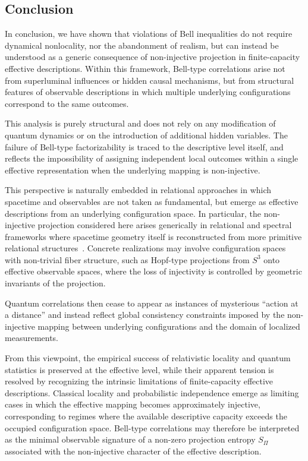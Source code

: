 \subsection{Conclusion}
  \label{subsec:conclusion}

  In conclusion, we have shown that violations of Bell inequalities do not require
  dynamical nonlocality, nor the abandonment of realism, but can instead be understood
  as a generic consequence of non-injective projection in finite-capacity effective
  descriptions.
  Within this framework, Bell-type correlations arise not from superluminal influences
  or hidden causal mechanisms, but from structural features of observable descriptions
  in which multiple underlying configurations correspond to the same outcomes.

  This analysis is purely structural and does not rely on any modification of quantum
  dynamics or on the introduction of additional hidden variables.
  The failure of Bell-type factorizability is traced to the descriptive level itself,
  and reflects the impossibility of assigning independent local outcomes within a
  single effective representation when the underlying mapping is non-injective.

  This perspective is naturally embedded in relational approaches in which spacetime
  and observables are not taken as fundamental, but emerge as effective descriptions
  from an underlying configuration space.
  In particular, the non-injective projection considered here arises generically in
  relational and spectral frameworks where spacetime geometry itself is reconstructed
  from more primitive relational structures~\cite{Beau2026a}.
  Concrete realizations may involve configuration spaces with non-trivial fiber
  structure, such as Hopf-type projections from $S^3$ onto effective observable
  spaces, where the loss of injectivity is controlled by geometric invariants of
  the projection.

  Quantum correlations then cease to appear as instances of mysterious ``action at a
  distance'' and instead reflect global consistency constraints imposed by the
  non-injective mapping between underlying configurations and the domain of localized
  measurements.

  From this viewpoint, the empirical success of relativistic locality and quantum
  statistics is preserved at the effective level, while their apparent tension is resolved
  by recognizing the intrinsic limitations of finite-capacity effective descriptions.
  Classical locality and probabilistic independence emerge as limiting cases in which
  the effective mapping becomes approximately injective, corresponding to regimes where
  the available descriptive capacity exceeds the occupied configuration space.
  Bell-type correlations may therefore be interpreted as the minimal observable
  signature of a non-zero projection entropy $S_{\Pi}$ associated with the
  non-injective character of the effective description.
